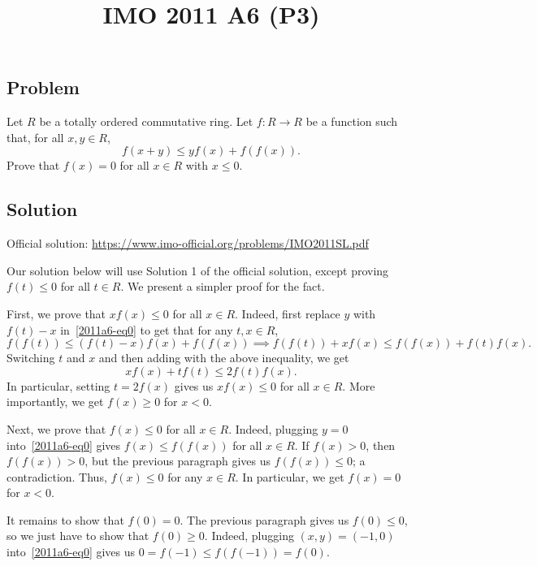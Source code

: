 \documentclass{article}
\title{IMO 2011 A6 (P3)}
\author{}
\date{}
\begin{document}
\maketitle



\subsection*{Problem}

Let $R$ be a totally ordered commutative ring.
Let $f : R \to R$ be a function such that, for all $x, y \in R$,
\[ f(x + y) \leq y f(x) + f(f(x)). \tag{*}\label{2011a6-eq0} \]
Prove that $f(x) = 0$ for all $x \in R$ with $x \leq 0$.



\subsection*{Solution}

Official solution: \url{https://www.imo-official.org/problems/IMO2011SL.pdf}

Our solution below will use Solution 1 of the official solution, except proving $f(t) \leq 0$ for all $t \in R$.
We present a simpler proof for the fact.

First, we prove that $x f(x) \leq 0$ for all $x \in R$.
Indeed, first replace $y$ with $f(t) - x$ in~\eqref{2011a6-eq0} to get that for any $t, x \in R$,
\[ f(f(t)) \leq (f(t) - x) f(x) + f(f(x)) \implies f(f(t)) + x f(x) \leq f(f(x)) + f(t) f(x). \]
Switching $t$ and $x$ and then adding with the above inequality, we get
\[ x f(x) + t f(t) \leq 2 f(t) f(x). \]
In particular, setting $t = 2 f(x)$ gives us $xf(x) \leq 0$ for all $x \in R$.
More importantly, we get $f(x) \geq 0$ for $x < 0$.

Next, we prove that $f(x) \leq 0$ for all $x \in R$.
Indeed, plugging $y = 0$ into~\eqref{2011a6-eq0} gives $f(x) \leq f(f(x))$ for all $x \in R$.
If $f(x) > 0$, then $f(f(x)) > 0$, but the previous paragraph gives us $f(f(x)) \leq 0$; a contradiction.
Thus, $f(x) \leq 0$ for any $x \in R$.
In particular, we get $f(x) = 0$ for $x < 0$.

It remains to show that $f(0) = 0$.
The previous paragraph gives us $f(0) \leq 0$, so we just have to show that $f(0) \geq 0$.
Indeed, plugging $(x, y) = (-1, 0)$ into~\eqref{2011a6-eq0} gives us $0 = f(-1) \leq f(f(-1)) = f(0)$.
\end{document}
